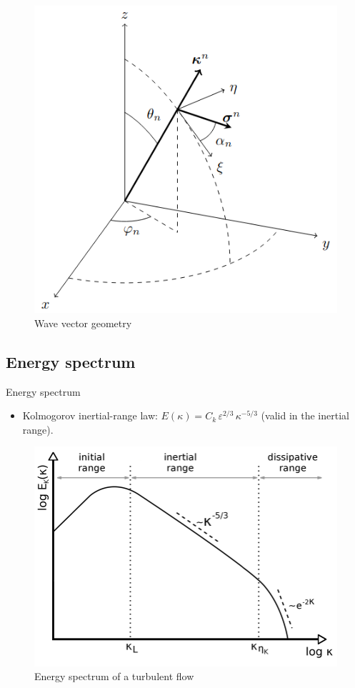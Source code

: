 \documentclass[11pt]{beamer}
\begin{document}
\begin{frame}
  \begin{figure}
    \centering
    \includegraphics[width=0.6\linewidth]{illustrations/WaveVectorGeometry.png}
    \caption{Wave vector geometry}
  \end{figure}
\end{frame}

\subsection{Energy spectrum}
\begin{frame}{Energy spectrum}
  \begin{itemize}
    \item Kolmogorov inertial-range law: $E(\kappa)=C_k\,\varepsilon^{2/3}\,\kappa^{-5/3}$ (valid in the inertial range).
  \end{itemize}
  \begin{figure}
    \centering
    \includegraphics[width=0.7\linewidth]{illustrations/energy-spectrum-example.png}
    \caption{Energy spectrum of a turbulent flow}
  \end{figure}
\end{frame}
\end{document}
